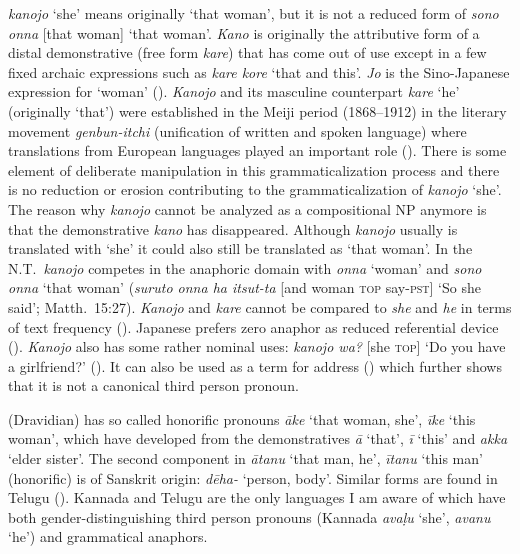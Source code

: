 \documentclass[output=collectionpaper]{langsci/langscibook}
\begin{document}
 \textit{kanojo} ‘she’ means originally ‘that woman’, but it is not a reduced form of \textit{sono onna} [that woman] ‘that woman’. \textit{Kano} is originally the attributive form of a distal demonstrative (free form \textit{kare}) that has come out of use except in a few fixed archaic expressions such as \textit{kare kore} ‘that and this’. \textit{Jo} is the Sino-Japanese expression for ‘woman’ (\citealt[141]{Ishiyama2008}). \textit{Kanojo} and its masculine counterpart \textit{kare} ‘he’ (originally ‘that’) were established in the Meiji period (1868--1912) in the literary movement \textit{genbun-itchi} (unification of written and spoken language) where translations from European languages played an important role (\citealt[139]{Ishiyama2008}). There is some element of deliberate manipulation in this grammaticalization process and there is no reduction or erosion contributing to the grammaticalization of \textit{kanojo} ‘she’. The reason why \textit{kanojo} cannot be analyzed as a compositional NP anymore is that the demonstrative \textit{kano} has disappeared. Although \textit{kanojo} usually is translated with ‘she’ it could also still be translated as ‘that woman’. In the N.T.\ \textit{kanojo} competes in the anaphoric domain with \textit{onna} ‘woman’ and \textit{sono onna} ‘that woman’ (\textit{suruto onna ha itsut-ta} [and woman \textsc{top} say-\textsc{pst}] ‘So she said’; Matth.~15:27). \textit{Kanojo} and \textit{kare} cannot be compared to \textit{she} and \textit{he} in terms of text frequency (\citealt[36]{Ishiyama2008}). Japanese prefers zero anaphor as reduced referential device (\citealt[44]{Kibrik2011}). \textit{Kanojo} also has some rather nominal uses: \textit{kanojo wa?} [she \textsc{top}] ‘Do you have a girlfriend?’ (\citealt[232]{Ishiyama2008}). It can also be used as a term for address (\citealt[232]{Ishiyama2008}) which further shows that it is not a canonical third person pronoun.

 (Dravidian) has so called honorific pronouns \textit{āke} ‘that woman, she’, \textit{īke} ‘this woman’, which have developed from the demonstratives \textit{ā} ‘that’, \textit{ī} ‘this’ and \textit{akka} ‘elder sister’. The second component in \textit{ātanu} ‘that man, he’, \textit{ītanu} ‘this man’ (honorific) is of Sanskrit origin: \textit{dēha-} ‘person, body’. Similar forms are found in Telugu (\citealt[171]{Andronov2003}). Kannada and Telugu are the only languages I am aware of which have both gender-distinguishing third person pronouns (Kannada \textit{avaḷu} ‘she’, \textit{avanu} ‘he’) and grammatical anaphors.
\end{document}
